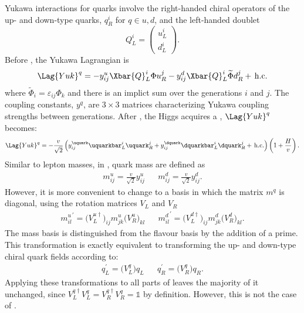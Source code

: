 Yukawa interactions for quarks involve the right-handed chiral operators of the up- and down-type
quarks, $q_R^i$ for $q\in{u,d}$, and the left-handed doublet
\begin{equation}
  Q_L^i = \begin{pmatrix}u^i_L\\d^i_L\end{pmatrix}.
\end{equation}
Before \SSB, the Yukawa Lagrangian is
\begin{equation}
  \Lag{Yuk}^q = - y_{ij}^u\Xbar{Q}_L^i\Phi u_R^j
  - y_{ij}^d\Xbar{Q}_L^i\widetilde\Phi d_R^j +\,\mathrm{h.c.}
  \label{eq:th:lagyukq}
\end{equation}
where $\widetilde\Phi_i = \varepsilon_{ij}\Phi_k$ and there is an implict sum over the generations
$i$ and $j$.
The coupling constants, $y^{q}$, are $3\times3$ matrices characterizing Yukawa coupling strengths
between generations.
After \SSB, the Higgs acquires a \VEV, $\Lag{Yuk}^q$ becomes:
\begin{equation}
  \Lag{Yuk}^q =
  - \frac{v}{\sqrt{2}}
  \left(
  y_{ij}^\uquark\uquarkbar_L^i\uquark_R^j
  + y_{ij}^\dquark\dquarkbar_L^i\dquark_R^j
  +\,\mathrm{h.c.}
  \right)
  \left(1 + \frac{H}{v}\right).
  \label{eq:th:lagyuk2}
\end{equation}
Similar to lepton masses, in , quark mass are defined as
\begin{align}
  m_{ij}^u = \frac{v}{\sqrt{2}}y_{ij}^u &&
  m_{ij}^d = \frac{v}{\sqrt{2}}y_{ij}^d.
\end{align}
However, it is more convenient to change to a basis in which the matrix $m^q$
is diagonal, using the rotation matrices $V_L$ and $V_R$
\begin{align}
  {m_{il}^{u}}^\prime =  \big(V_L^{u\dagger}\big)_{ij} m_{jk}^u\big(V_R^u\big)_{kl} &&
  {m_{il}^{d}}^\prime =  \big(V_L^{d\dagger}\big)_{ij} m_{jk}^d\big(V_R^d\big)_{kl}.
\end{align}
The mass basis is distinguished from the flavour basis by the addition of a prime.
This transformation is exactly equivalent to transforming the up- and
down-type chiral quark fields according to:
\begin{align}
  q_L^\prime = \big(V_L^q\big)q_{L}^{} &&
  q_R^\prime = \big(V_R^q\big)q_{R}^{}.
\end{align}
Applying these transformations to all parts of  leaves the majority of it unchanged, since
$V_{L}^{q\dagger} V_{L}^{q} = V_{R}^{q\dagger} V_{R}^{q} = \mathds{1}$ by definition.
However, this is not the case of .

